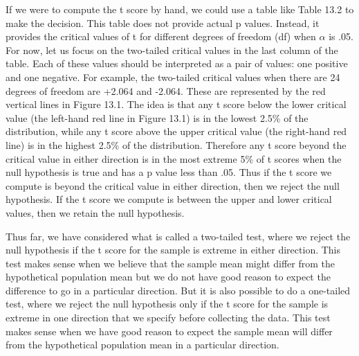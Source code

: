 If we were to compute the t score by hand, we could use a table like Table 13.2 to make the decision. This table does not provide actual p values. Instead, it provides the critical values of t for different degrees of freedom (df) when $\alpha$ is .05. For now, let us focus on the two-tailed critical values in the last column of the table. Each of these values should be interpreted as a pair of values: one positive and one negative. For example, the two-tailed critical values when there are 24 degrees of freedom are +2.064 and -2.064. These are represented by the red vertical lines in Figure 13.1. The idea is that any t score below the lower critical value (the left-hand red line in Figure 13.1) is in the lowest 2.5\% of the distribution, while any t score above the upper critical value (the right-hand red line) is in the highest 2.5\% of the distribution. Therefore any t score beyond the critical value in either direction is in the
 most extreme 5\% of t scores when the null hypothesis is true and has a p value less than .05. Thus if the t score we compute is beyond the critical value in either direction, then we reject the null hypothesis. If the t score we compute is between the upper and lower critical values, then we retain the null hypothesis.


Thus far, we have considered what is called a two-tailed test, where we reject the null hypothesis if the t score for the sample is extreme in either direction. This test makes sense when we believe that the sample mean might differ from the hypothetical population mean but we do not have good reason to expect the difference to go in a particular direction. But it is also possible to do a one-tailed test, where we reject the null hypothesis only if the t score for the sample is extreme in one direction that we specify before collecting the data. This test makes sense when we have good reason to expect the sample mean will differ from the hypothetical population mean in a particular direction.


